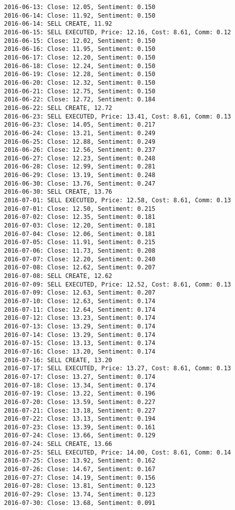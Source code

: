 \documentclass[11pt]{article}
\begin{document}
\begin{Verbatim}[commandchars=\\\{\}]
2016-06-13: Close: 12.05, Sentiment: 0.150
2016-06-14: Close: 11.92, Sentiment: 0.150
2016-06-14: SELL CREATE, 11.92
2016-06-15: SELL EXECUTED, Price: 12.16, Cost: 8.61, Comm: 0.12
2016-06-15: Close: 12.02, Sentiment: 0.150
2016-06-16: Close: 11.95, Sentiment: 0.150
2016-06-17: Close: 12.20, Sentiment: 0.150
2016-06-18: Close: 12.24, Sentiment: 0.150
2016-06-19: Close: 12.28, Sentiment: 0.150
2016-06-20: Close: 12.32, Sentiment: 0.150
2016-06-21: Close: 12.75, Sentiment: 0.150
2016-06-22: Close: 12.72, Sentiment: 0.184
2016-06-22: SELL CREATE, 12.72
2016-06-23: SELL EXECUTED, Price: 13.41, Cost: 8.61, Comm: 0.13
2016-06-23: Close: 14.05, Sentiment: 0.217
2016-06-24: Close: 13.21, Sentiment: 0.249
2016-06-25: Close: 12.88, Sentiment: 0.249
2016-06-26: Close: 12.56, Sentiment: 0.237
2016-06-27: Close: 12.23, Sentiment: 0.248
2016-06-28: Close: 12.99, Sentiment: 0.281
2016-06-29: Close: 13.19, Sentiment: 0.248
2016-06-30: Close: 13.76, Sentiment: 0.247
2016-06-30: SELL CREATE, 13.76
2016-07-01: SELL EXECUTED, Price: 12.58, Cost: 8.61, Comm: 0.13
2016-07-01: Close: 12.50, Sentiment: 0.215
2016-07-02: Close: 12.35, Sentiment: 0.181
2016-07-03: Close: 12.20, Sentiment: 0.181
2016-07-04: Close: 12.06, Sentiment: 0.181
2016-07-05: Close: 11.91, Sentiment: 0.215
2016-07-06: Close: 11.73, Sentiment: 0.208
2016-07-07: Close: 12.20, Sentiment: 0.240
2016-07-08: Close: 12.62, Sentiment: 0.207
2016-07-08: SELL CREATE, 12.62
2016-07-09: SELL EXECUTED, Price: 12.52, Cost: 8.61, Comm: 0.13
2016-07-09: Close: 12.63, Sentiment: 0.207
2016-07-10: Close: 12.63, Sentiment: 0.174
2016-07-11: Close: 12.64, Sentiment: 0.174
2016-07-12: Close: 13.23, Sentiment: 0.174
2016-07-13: Close: 13.29, Sentiment: 0.174
2016-07-14: Close: 13.29, Sentiment: 0.174
2016-07-15: Close: 13.13, Sentiment: 0.174
2016-07-16: Close: 13.20, Sentiment: 0.174
2016-07-16: SELL CREATE, 13.20
2016-07-17: SELL EXECUTED, Price: 13.27, Cost: 8.61, Comm: 0.13
2016-07-17: Close: 13.27, Sentiment: 0.174
2016-07-18: Close: 13.34, Sentiment: 0.174
2016-07-19: Close: 13.22, Sentiment: 0.196
2016-07-20: Close: 13.59, Sentiment: 0.227
2016-07-21: Close: 13.18, Sentiment: 0.227
2016-07-22: Close: 13.13, Sentiment: 0.194
2016-07-23: Close: 13.39, Sentiment: 0.161
2016-07-24: Close: 13.66, Sentiment: 0.129
2016-07-24: SELL CREATE, 13.66
2016-07-25: SELL EXECUTED, Price: 14.00, Cost: 8.61, Comm: 0.14
2016-07-25: Close: 13.92, Sentiment: 0.162
2016-07-26: Close: 14.67, Sentiment: 0.167
2016-07-27: Close: 14.19, Sentiment: 0.156
2016-07-28: Close: 13.81, Sentiment: 0.123
2016-07-29: Close: 13.74, Sentiment: 0.123
2016-07-30: Close: 13.68, Sentiment: 0.091

\end{Verbatim}
\end{document}
